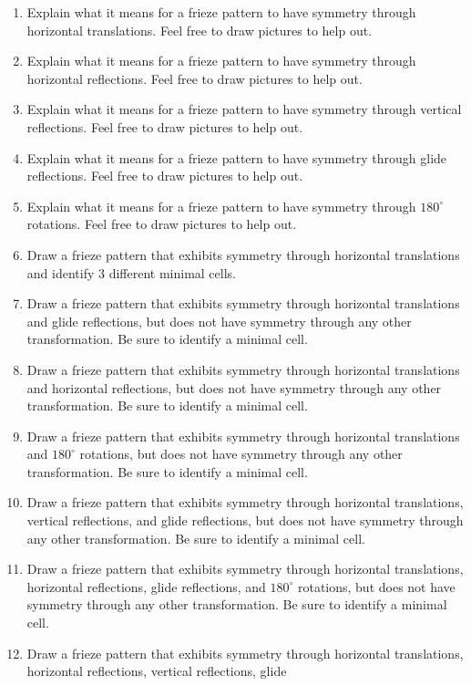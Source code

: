 \problems
\begin{enumerate}
\item Explain what it means for a frieze pattern to have symmetry
  through horizontal translations. Feel free to draw pictures to help out.
\item Explain what it means for a frieze pattern to have symmetry
  through horizontal reflections. Feel free to draw pictures to help out.
\item Explain what it means for a frieze pattern to have symmetry
  through vertical reflections. Feel free to draw pictures to help out.
\item Explain what it means for a frieze pattern to have symmetry
  through glide reflections. Feel free to draw pictures to help out.
\item Explain what it means for a frieze pattern to have symmetry
  through $180^\circ$ rotations. Feel free to draw pictures to help out.
\item Draw a frieze pattern that exhibits symmetry through horizontal
  translations and identify $3$ different minimal cells.
\item Draw a frieze pattern that exhibits symmetry through horizontal
  translations and glide reflections, but does not have symmetry
  through any other transformation. Be sure to identify a minimal
  cell.
\item Draw a frieze pattern that exhibits symmetry through horizontal
  translations and horizontal reflections, but does not have symmetry
  through any other transformation. Be sure to identify a minimal
  cell.
\item Draw a frieze pattern that exhibits symmetry through horizontal
  translations and $180^\circ$ rotations, but does not have symmetry
  through any other transformation. Be sure to identify a minimal
  cell.
\item Draw a frieze pattern that exhibits symmetry through horizontal
  translations, vertical reflections, and glide reflections, but does
  not have symmetry through any other transformation. Be sure to
  identify a minimal cell.
\item Draw a frieze pattern that exhibits symmetry through horizontal
  translations, horizontal reflections, glide reflections, and
  $180^\circ$ rotations, but does not have symmetry through any other
  transformation. Be sure to identify a minimal cell.
\item Draw a frieze pattern that exhibits symmetry through horizontal
  translations, horizontal reflections, vertical reflections, glide

\end{enumerate}
